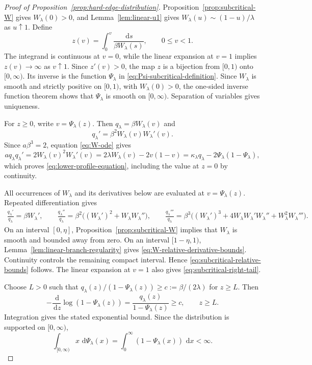 \documentclass[a4paper,fleqn]{cas-sc}
\numberwithin{equation}{section}
\theoremstyle{plain}
\theoremstyle{definition}
\newcommand{\dd}{\,\mathrm d}
\begin{document}
\begin{proof}[Proof of Proposition~\ref{prop:hard-edge-distribution}]
Proposition~\ref{prop:subcritical-W} gives $W_{\lambda}(0)>0$, and
Lemma~\ref{lem:linear-u1} gives
$W_{\lambda}(u)\sim(1-u)/\lambda$ as $u\uparrow1$.  Define
\[
 z(v)=\int_0^v\frac{\dd s}{\beta W_{\lambda}(s)},
 \qquad 0\le v<1.
\]
The integrand is continuous at $v=0$, while the linear expansion at $v=1$
implies $z(v)\to\infty$ as $v\uparrow1$.  Since $z'(v)>0$, the map $z$ is
a bijection from $[0,1)$ onto $[0,\infty)$.  Its inverse is the function
$\Psi_{\lambda}$ in \eqref{eq:Psi-subcritical-definition}.  Since
$W_{\lambda}$ is smooth and strictly positive on $[0,1)$, with
$W_{\lambda}(0)>0$, the one-sided inverse function theorem shows that
$\Psi_{\lambda}$ is smooth on $[0,\infty)$.  Separation of variables gives
uniqueness.

For $z\ge0$, write $v=\Psi_{\lambda}(z)$.  Then
$q_{\lambda}=\beta W_{\lambda}(v)$ and
\[
 q_{\lambda}'=\beta^2W_{\lambda}(v)W_{\lambda}'(v).
\]
Since $a\beta^3=2$, equation \eqref{eq:W-ode} gives
\[
 a q_{\lambda}q_{\lambda}'
 =2W_{\lambda}(v)^2W_{\lambda}'(v)
 =2\lambda W_{\lambda}(v)-2v(1-v)
 =\kappa_{\lambda}q_{\lambda}
  -2\Psi_{\lambda}(1-\Psi_{\lambda}),
\]
which proves \eqref{eq:lower-profile-equation}, including the value at
$z=0$ by continuity.

All occurrences of $W_{\lambda}$ and its derivatives below are evaluated at
$v=\Psi_{\lambda}(z)$.  Repeated differentiation gives
\[
\begin{aligned}
 \frac{q_{\lambda}'}{q_{\lambda}}
 =\beta W_{\lambda}',\qquad
 \frac{q_{\lambda}''}{q_{\lambda}}
 =\beta^2\bigl((W_{\lambda}')^2
   +W_{\lambda}W_{\lambda}''\bigr),\qquad
 \frac{q_{\lambda}'''}{q_{\lambda}}
 =\beta^3\bigl((W_{\lambda}')^3
   +4W_{\lambda}W_{\lambda}'W_{\lambda}''
   +W_{\lambda}^2W_{\lambda}'''\bigr).
\end{aligned}
\]
On an interval $[0,\eta]$, Proposition~\ref{prop:subcritical-W} implies that
$W_{\lambda}$ is smooth and bounded away from zero.  On an interval
$[1-\eta,1)$, Lemma~\ref{lem:linear-branch-regularity} gives
\eqref{eq:W-relative-derivative-bounds}.  Continuity controls the remaining
compact interval.  Hence \eqref{eq:subcritical-relative-bounds} follows.
The linear expansion at $v=1$ also gives
\eqref{eq:subcritical-right-tail}.

Choose $L>0$ such that
$q_{\lambda}(z)/(1-\Psi_{\lambda}(z))\ge
c:=\beta/(2\lambda)$ for $z\ge L$.  Then
\[
 -\frac{\dd}{\dd z}\log(1-\Psi_{\lambda}(z))
 =\frac{q_{\lambda}(z)}{1-\Psi_{\lambda}(z)}\ge c,
 \qquad z\ge L.
\]
Integration gives the stated exponential bound.  Since the distribution is
supported on $[0,\infty)$,
\[
 \int_{[0,\infty)}x\,\dd\Psi_{\lambda}(x)
 =\int_0^\infty(1-\Psi_{\lambda}(x))\,\dd x<\infty.
\]


\end{proof}
\end{document}

